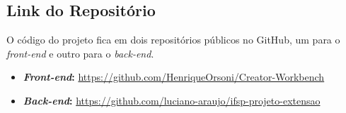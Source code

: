 \subsection{Link do Repositório}

O código do projeto fica em dois repositórios públicos no GitHub, um para o \textit{front-end} e outro para o \textit{back-end}.

\begin{itemize}
    \item \textbf{\textit{Front-end}:} \url{https://github.com/HenriqueOrsoni/Creator-Workbench}
    \item \textbf{\textit{Back-end}:} \url{https://github.com/luciano-araujo/ifsp-projeto-extensao}
\end{itemize}